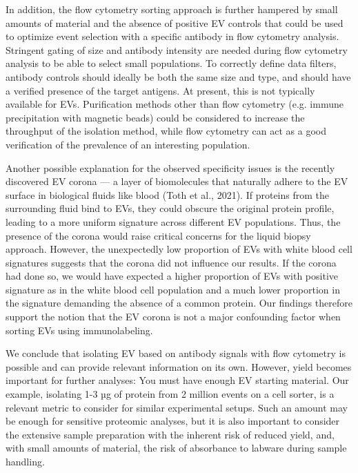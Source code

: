 \documentclass[authordate, empirical]{jote-new-article}
\begin{document}
	In addition, the flow cytometry sorting approach is further hampered by small amounts of material and the absence of positive EV controls that could be used to optimize event selection with a specific antibody in flow cytometry analysis. Stringent gating of size and antibody intensity are needed during flow cytometry analysis to be able to select small populations. To correctly define data filters, antibody controls should ideally be both the same size and type, and should have a verified presence of the target antigens. At present, this is not typically available for EVs. Purification methods other than flow cytometry (e.g. immune precipitation with magnetic beads) could be considered to increase the throughput of the isolation method, while flow cytometry can act as a good verification of the prevalence of an interesting population.



	Another possible explanation for the observed specificity issues is the recently discovered EV corona — a layer of biomolecules that naturally adhere to the EV surface in biological fluids like blood (Toth et al., 2021). If proteins from the surrounding fluid bind to EVs, they could obscure the original protein profile, leading to a more uniform signature across different EV populations. Thus, the presence of the corona would raise critical concerns for the liquid biopsy approach. However, the unexpectedly low proportion of EVs with white blood cell signatures suggests that the corona did not influence our results. If the corona had done so, we would have expected a higher proportion of EVs with positive signature as in the white blood cell population and a much lower proportion in the signature demanding the absence of a common protein. Our findings therefore support the notion that the EV corona is not a major confounding factor when sorting EVs using immunolabeling.







	We conclude that isolating EV based on antibody signals with flow cytometry is possible and can provide relevant information on its own. However, yield becomes important for further analyses: You must have enough EV starting material. Our example, isolating 1-3 µg of protein from 2 million events on a cell sorter, is a relevant metric to consider for similar experimental setups. Such an amount may be enough for sensitive proteomic analyses, but it is also important to consider the extensive sample preparation with the inherent risk of reduced yield, and, with small amounts of material, the risk of absorbance to labware during sample handling.
\end{document}
